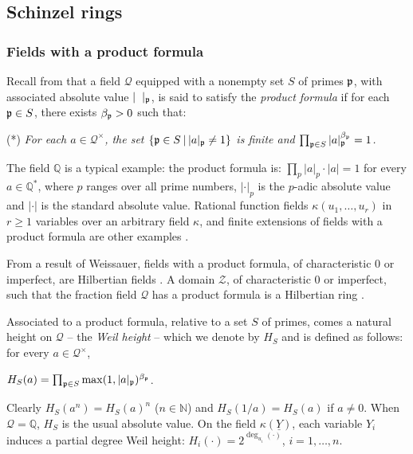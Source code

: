 \documentclass[11pt,a4paper,reqno]{amsart}
\theoremstyle{definition}
\begin{document}
 
 


\subsection{Schinzel rings} \label{ssec:schinzel-rings}
\subsubsection{Fields with a product formula}
\label{sssec:FDP}
Recall from \cite[\S 17.3]{FJ23} that a field ${\mathcal Q}$ equipped with a nonempty set $S$ of primes ${\frak p}$, with associated absolute value $|\hskip 2mm |_{\frak p}$, is said to satisfy the \emph{product formula} if for each ${\frak p}\in S$, there exists $\beta_{{\frak p}} >0$ such that:
\vskip 1mm

\noindent
(*) {\it For each $a\in {\mathcal Q}^\times$, the set $\{{\frak p}\in S \hskip 2pt | \hskip 2pt |a|_{\frak p} \not=1 \}$ is finite and $\prod_{{\frak p}\in S} |a|_{\frak p}^{\beta_{{\frak p}}} = 1$.}

\vskip 1mm

The field ${\mathbb Q}$ is a typical example: the product formula is: $\prod_{p} |a|_p \cdot |a| = 1$ for every $a\in {\mathbb Q}^\ast$, where $p$ ranges over all prime numbers, $|\cdot|_p$ is the $p$-adic absolute value and $|\cdot |$ is the standard absolute value. Rational function fields $\kappa(u_1,\ldots,u_r)$ in $r\geq 1$ variables over an arbitrary field $\kappa$, and finite extensions of fields with a product formula are other examples \cite[\S 17.3]{FJ23}. 

From a result of Weissauer, fields with a product formula, of characteristic $0$ or imperfect, are Hilbertian fields \cite[Theorem 17.3.3]{FJ23}. A domain ${\mathcal Z}$, of characteristic $0$ or imperfect, such that the fraction field ${\mathcal Q}$ has a product formula is a Hilbertian ring \cite[Theorem 4.6]{BDN20b}.

Associated to a product formula, relative to a set $S$ of primes, comes a natural height on ${\mathcal Q}$ -- the \emph{Weil height} -- which we denote by $H_S$ and  is defined as follows: for every $a\in {\mathcal Q}^\times$,
\vskip 1mm

\centerline{$H_S(a) = \prod_{{\frak p} \in S} \max(1,|a|_{\frak p})^{\beta_{\frak p}}$.}

\vskip 1mm
\noindent
Clearly $H_S(a^n) = H_S(a)^n$ ($n\in {\mathbb N}$) and 
$H_S(1/a) = H_S(a)$ if $a\not=0$. 
When ${\mathcal Q} = {\mathbb Q}$, $H_S$ is the usual absolute value. On the field $\kappa(\underline Y)$, each variable $Y_i$ induces a partial degree Weil height: $H_{i}(\cdot) = 2^{\deg_{u_i}(\cdot)}$, $i=1,\ldots, n$.
\end{document}

